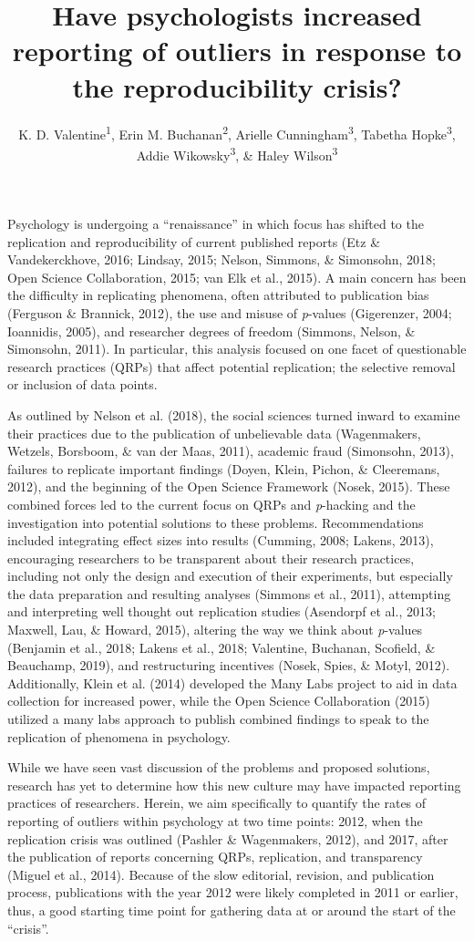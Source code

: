 \documentclass[english,,man]{apa6}
\title{Have psychologists increased reporting of outliers in response to the reproducibility crisis?}
\author{K. D. Valentine\textsuperscript{1}, Erin M. Buchanan\textsuperscript{2}, Arielle Cunningham\textsuperscript{3}, Tabetha Hopke\textsuperscript{3}, Addie Wikowsky\textsuperscript{3}, \& Haley Wilson\textsuperscript{3}}
\date{}
\affiliation{
\vspace{0.5cm}
\textsuperscript{1} University of Missouri\\\textsuperscript{2} Harrisburg University of Science and Technology\\\textsuperscript{3} Missouri State University}
\begin{document}
\maketitle

Psychology is undergoing a \enquote{renaissance} in which focus has shifted to the replication and reproducibility of current published reports (Etz \& Vandekerckhove, 2016; Lindsay, 2015; Nelson, Simmons, \& Simonsohn, 2018; Open Science Collaboration, 2015; van Elk et al., 2015). A main concern has been the difficulty in replicating phenomena, often attributed to publication bias (Ferguson \& Brannick, 2012), the use and misuse of \emph{p}-values (Gigerenzer, 2004; Ioannidis, 2005), and researcher degrees of freedom (Simmons, Nelson, \& Simonsohn, 2011). In particular, this analysis focused on one facet of questionable research practices (QRPs) that affect potential replication; the selective removal or inclusion of data points.

As outlined by Nelson et al. (2018), the social sciences turned inward to examine their practices due to the publication of unbelievable data (Wagenmakers, Wetzels, Borsboom, \& van der Maas, 2011), academic fraud (Simonsohn, 2013), failures to replicate important findings (Doyen, Klein, Pichon, \& Cleeremans, 2012), and the beginning of the Open Science Framework (Nosek, 2015). These combined forces led to the current focus on QRPs and \emph{p}-hacking and the investigation into potential solutions to these problems. Recommendations included integrating effect sizes into results (Cumming, 2008; Lakens, 2013), encouraging researchers to be transparent about their research practices, including not only the design and execution of their experiments, but especially the data preparation and resulting analyses (Simmons et al., 2011), attempting and interpreting well thought out replication studies (Asendorpf et al., 2013; Maxwell, Lau, \& Howard, 2015), altering the way we think about \emph{p}-values (Benjamin et al., 2018; Lakens et al., 2018; Valentine, Buchanan, Scofield, \& Beauchamp, 2019), and restructuring incentives (Nosek, Spies, \& Motyl, 2012). Additionally, Klein et al. (2014) developed the Many Labs project to aid in data collection for increased power, while the Open Science Collaboration (2015) utilized a many labs approach to publish combined findings to speak to the replication of phenomena in psychology.

While we have seen vast discussion of the problems and proposed solutions, research has yet to determine how this new culture may have impacted reporting practices of researchers. Herein, we aim specifically to quantify the rates of reporting of outliers within psychology at two time points: 2012, when the replication crisis was outlined (Pashler \& Wagenmakers, 2012), and 2017, after the publication of reports concerning QRPs, replication, and transparency (Miguel et al., 2014). Because of the slow editorial, revision, and publication process, publications with the year 2012 were likely completed in 2011 or earlier, thus, a good starting time point for gathering data at or around the start of the \enquote{crisis}.
\end{document}
